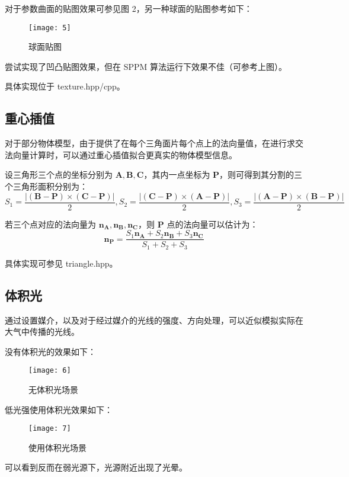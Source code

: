 \documentclass[a4paper]{article}
\begin{document}
    对于参数曲面的贴图效果可参见图 2，另一种球面的贴图参考如下：

    \begin{figure}[h]
        \centering
        \texttt{[image: 5]}
        \caption{球面贴图}
        \label{fig5}
    \end{figure}

    尝试实现了凹凸贴图效果，但在 SPPM 算法运行下效果不佳（可参考上图）。

    具体实现位于 texture.hpp/cpp。

    \subsection{重心插值}
    对于部分物体模型，由于提供了在每个三角面片每个点上的法向量值，在进行求交法向量计算时，可以通过重心插值拟合更真实的物体模型信息。

    设三角形三个点的坐标分别为 $\pmb{A}, \pmb{B}, \pmb{C}$，其内一点坐标为 $\pmb{P}$，则可得到其分割的三个三角形面积分别为：
    $$
    S_1 = \frac{|(\pmb{B} - \pmb{P}) \times (\pmb{C} - \pmb{P})|}{2}, S_2 = \frac{|(\pmb{C} - \pmb{P}) \times (\pmb{A} - \pmb{P})|}{2}, S_3 = \frac{|(\pmb{A} - \pmb{P}) \times (\pmb{B} - \pmb{P})|}{2}
    $$

    若三个点对应的法向量为 $\pmb{n_A}, \pmb{n_B}, \pmb{n_C}$，则 $\pmb{P}$ 点的法向量可以估计为：
    $$
    \pmb{n_P} = \frac{S_1 \pmb{n_A} + S_2 \pmb{n_B} + S_3 \pmb{n_C}}{S_1 + S_2 + S_3}
    $$

    具体实现可参见 triangle.hpp。

    \subsection{体积光}

    通过设置媒介，以及对于经过媒介的光线的强度、方向处理，可以近似模拟实际在大气中传播的光线。

    没有体积光的效果如下：

    \begin{figure}[h]
        \centering
        \texttt{[image: 6]}
        \caption{无体积光场景}
        \label{fig6}
    \end{figure}

    低光强使用体积光效果如下：

    \begin{figure}[h]
        \centering
        \texttt{[image: 7]}
        \caption{使用体积光场景}
        \label{fig7}
    \end{figure}

    可以看到反而在弱光源下，光源附近出现了光晕。
\end{document}
